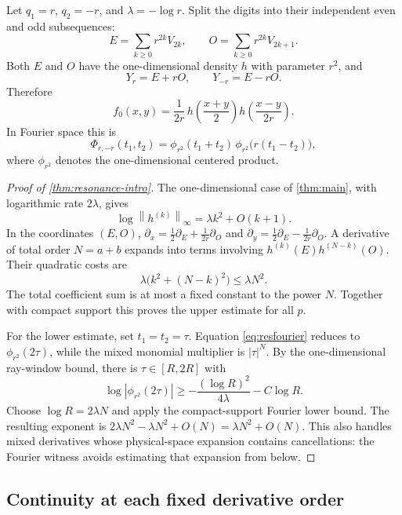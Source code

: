 \documentclass[11pt,a4paper]{article}
\numberwithin{equation}{section}
\theoremstyle{definition}
\theoremstyle{remark}\newtheorem{remark}[theorem]{Remark}
\newcommand{\norm}[1]{\left\lVert #1\right\rVert}
\begin{document}
Let $q_1=r$, $q_2=-r$, and $\lambda=-\log r$. Split the digits into their
independent even and odd subsequences:
\begin{equation}
 E=\sum_{k\ge0}r^{2k}V_{2k},\qquad
 O=\sum_{k\ge0}r^{2k}V_{2k+1}.
 \label{eq:EO}
\end{equation}
Both $E$ and $O$ have the one-dimensional density $h$ with parameter $r^2$,
and
\begin{equation}
 Y_r=E+rO,\qquad Y_{-r}=E-rO.
 \label{eq:paritymap}
\end{equation}
Therefore
\begin{equation}
 f_0(x,y)=\frac1{2r}\,
 h\!\left(\frac{x+y}{2}\right)
 h\!\left(\frac{x-y}{2r}\right).
 \label{eq:resdensity}
\end{equation}
In Fourier space this is
\begin{equation}
 \Phi_{r,-r}(t_1,t_2)
   =\phi_{r^2}(t_1+t_2)\,
     \phi_{r^2}\bigl(r(t_1-t_2)\bigr),
 \label{eq:resfourier}
\end{equation}
where $\phi_{r^2}$ denotes the one-dimensional centered product.

\begin{proof}[Proof of \cref{thm:resonance-intro}]
The one-dimensional case of \cref{thm:main}, with logarithmic rate $2\lambda$,
gives
\[
 \log\norm{h^{(k)}}_\infty=\lambda k^2+O(k+1).
\]
In the coordinates $(E,O)$,
$\partial_x=\tfrac12\partial_E+\tfrac1{2r}\partial_O$ and
$\partial_y=\tfrac12\partial_E-\tfrac1{2r}\partial_O$.
A derivative of total order $N=a+b$ expands into terms involving
$h^{(k)}(E)h^{(N-k)}(O)$. Their quadratic costs are
\[
 \lambda\bigl(k^2+(N-k)^2\bigr)\le\lambda N^2.
\]
The total coefficient sum is at most a fixed constant to the power $N$.
Together with compact support this proves the upper estimate for all $p$.

For the lower estimate, set $t_1=t_2=\tau$. Equation
\eqref{eq:resfourier} reduces to $\phi_{r^2}(2\tau)$, while the mixed
monomial multiplier is $|\tau|^N$. By the one-dimensional ray-window bound,
there is $\tau\in[R,2R]$ with
\[
 \log|\phi_{r^2}(2\tau)|\ge-\frac{(\log R)^2}{4\lambda}-C\log R.
\]
Choose $\log R=2\lambda N$ and apply the compact-support Fourier lower bound.
The resulting exponent is
$2\lambda N^2-\lambda N^2+O(N)=\lambda N^2+O(N)$.
This also handles mixed derivatives whose physical-space expansion contains
cancellations: the Fourier witness avoids estimating that expansion from below.
\end{proof}

\subsection{Continuity at each fixed derivative order}
\end{document}

